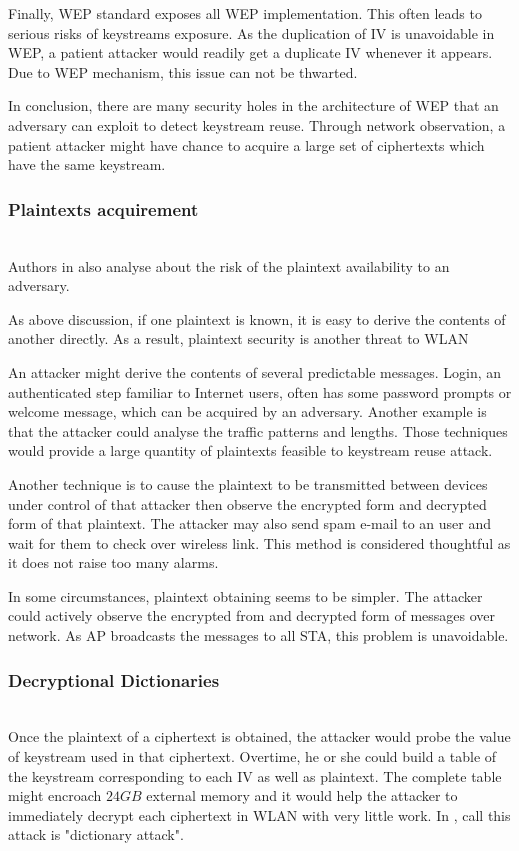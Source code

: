 Finally, \ac{WEP} standard exposes all \ac{WEP} implementation. This often leads to serious risks of keystreams exposure. As the duplication of \ac{IV} is unavoidable in \ac{WEP}, a patient attacker would readily get a duplicate \ac{IV} whenever it appears. Due to \ac{WEP} mechanism, this issue can not be thwarted.

In conclusion, there are many security holes in the architecture of \ac{WEP} that an adversary can exploit to detect keystream reuse. Through network observation, a patient attacker might have chance to acquire a large set of ciphertexts which have the same keystream.

\subsubsection{Plaintexts acquirement}~\\
Authors in \cite{borisov2001intercepting} also analyse about the risk of the plaintext availability to an adversary.

As above discussion, if one plaintext is known, it is easy to derive the contents of another directly. As a result, plaintext security is another threat to \ac{WLAN}

An attacker might derive the contents of several predictable messages. Login, an authenticated step familiar to Internet users, often has some password prompts or welcome message, which can be acquired by an adversary. Another example is that the attacker could analyse the traffic patterns and lengths. Those techniques would provide a large quantity of plaintexts feasible to keystream reuse attack.

Another technique is to cause the plaintext to be transmitted between devices under control of that attacker then observe the encrypted form and decrypted form of that plaintext. The attacker may also send spam e-mail to an user and wait for them to check over wireless link. This method is considered thoughtful as it does not raise too many alarms.

In some circumstances, plaintext obtaining seems to be simpler. The attacker could actively observe the encrypted from and decrypted form of messages over network. As \ac{AP} broadcasts the messages to all \ac{STA}, this problem is unavoidable.

\subsubsection{Decryptional Dictionaries}~\\
Once the plaintext of a ciphertext is obtained, the attacker would probe the value of keystream used in that ciphertext. Overtime, he or she could build a table of the keystream corresponding to each \ac{IV} as well as plaintext. The complete table might encroach $24GB$ external memory and it would help the attacker to immediately decrypt each ciphertext in \ac{WLAN} with very little work. In \cite{al2006ieee}, \citeauthor{al2006ieee} call this attack is "dictionary attack".


